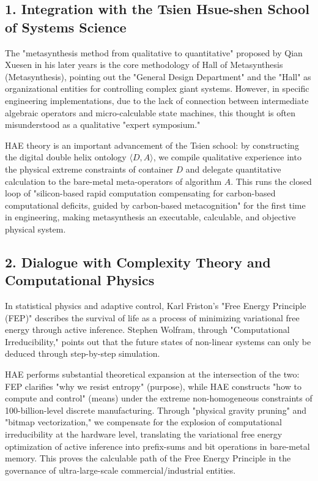 \documentclass[11pt,a4paper]{article}
\begin{document}
\subsection*{1. Integration with the Tsien Hsue-shen School of Systems Science}
The "metasynthesis method from qualitative to quantitative" proposed by Qian Xuesen in his later years is the core methodology of Hall of Metasynthesis (Metasynthesis), pointing out the "General Design Department" and the "Hall" as organizational entities for controlling complex giant systems. However, in specific engineering implementations, due to the lack of connection between intermediate algebraic operators and micro-calculable state machines, this thought is often misunderstood as a qualitative "expert symposium."

HAE theory is an important advancement of the Tsien school: by constructing the digital double helix ontology $\langle D, A \rangle$, we compile qualitative experience into the physical extreme constraints of container $D$ and delegate quantitative calculation to the bare-metal meta-operators of algorithm $A$. This runs the closed loop of "silicon-based rapid computation compensating for carbon-based computational deficits, guided by carbon-based metacognition" for the first time in engineering, making metasynthesis an executable, calculable, and objective physical system.

\subsection*{2. Dialogue with Complexity Theory and Computational Physics}
In statistical physics and adaptive control, Karl Friston's "Free Energy Principle (FEP)" describes the survival of life as a process of minimizing variational free energy through active inference. Stephen Wolfram, through "Computational Irreducibility," points out that the future states of non-linear systems can only be deduced through step-by-step simulation.

HAE performs substantial theoretical expansion at the intersection of the two: FEP clarifies "why we resist entropy" (purpose), while HAE constructs "how to compute and control" (means) under the extreme non-homogeneous constraints of 100-billion-level discrete manufacturing. Through "physical gravity pruning" and "bitmap vectorization," we compensate for the explosion of computational irreducibility at the hardware level, translating the variational free energy optimization of active inference into prefix-sums and bit operations in bare-metal memory. This proves the calculable path of the Free Energy Principle in the governance of ultra-large-scale commercial/industrial entities.
\end{document}
